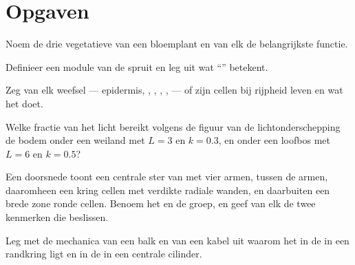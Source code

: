 \section{Opgaven}

\begin{exercise}[$\star$]\label{exo:b1:flowering-plant-organization:1}
Noem de drie vegetatieve  van een bloemplant en van elk de belangrijkste
functie.
\end{exercise}

\begin{exercise}[$\star$]\label{exo:b1:flowering-plant-organization:2}
Definieer een module van de spruit en leg uit wat ``''
betekent.
\end{exercise}

\begin{exercise}[$\star$]\label{exo:b1:flowering-plant-organization:3}
Zeg van elk weefsel --- epidermis, , , , ,
 --- of zijn cellen bij rijpheid leven en wat het doet.
\end{exercise}

\begin{exercise}[$\star$]\label{exo:b1:flowering-plant-organization:4}
Welke fractie van het licht bereikt volgens de figuur van de
lichtonderschepping de bodem onder een weiland met $L = 3$ en $k = 0.3$, en
onder een loofbos met $L = 6$ en $k = 0.5$?
\end{exercise}

\begin{exercise}[$\star\star$]\label{exo:b1:flowering-plant-organization:5}
Een doorsnede toont een centrale ster van  met vier armen,  tussen
de armen, daaromheen een kring cellen met verdikte radiale wanden, en daarbuiten
een brede zone ronde cellen. Benoem het  en de groep, en geef van elk de
twee kenmerken die beslissen.
\end{exercise}

\begin{exercise}[$\star\star$]\label{exo:b1:flowering-plant-organization:6}
Leg met de mechanica van een balk en van een kabel uit waarom het 
in de  in een randkring ligt en in de  in een centrale cilinder.
\end{exercise}

